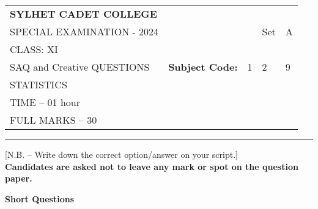 \documentclass{exam}
\begin{document}
\begin{table}[h]
\centering
\begin{tabular}{lllll}
\textbf{\large SYLHET CADET COLLEGE} &  &  &  &  \\ \cline{4-5} 
SPECIAL EXAMINATION - 2024 &  & \multicolumn{1}{l|}{} & \multicolumn{1}{l|}{Set} & \multicolumn{1}{l|}{A} \\ \cline{4-5} 
CLASS: XI &  &  &  &  \\ \cline{3-5} 
SAQ and Creative QUESTIONS & \multicolumn{1}{l|}{\textbf{Subject Code:}} & \multicolumn{1}{l|}{1} & \multicolumn{1}{l|}{2} & \multicolumn{1}{l|}{9} \\ \cline{3-5} 
STATISTICS &  &  &  &  \\
TIME – 01 hour &  &  &  &  \\
FULL MARKS – 30 &  &  &  & 
\end{tabular}
\end{table}
\hrule

\begin{center}
[N.B. – Write down the correct option/answer on your script.]\\

  
  \textbf{Candidates are asked not to leave any mark or spot on the question paper.}
\end{center}

\textbf{Short Questions}

\onehalfspacing %
\end{document}
